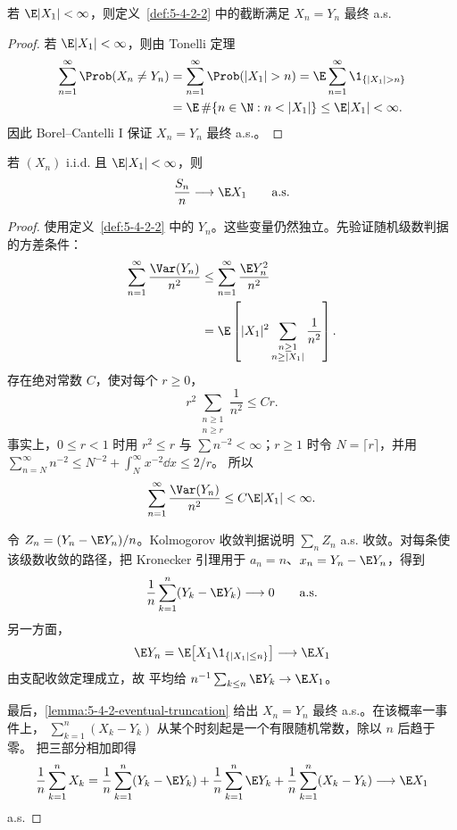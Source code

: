 \begin{lemma}[可积变量的逐项截断最终不变]\label{lemma:5-4-2-eventual-truncation}
若 $\E|X_1|<\infty$，则定义~\ref{def:5-4-2-2} 中的截断满足 $X_n=Y_n$ 最终 a.s.
\end{lemma}

\begin{proof}
若 $\E|X_1|<\infty$，则由 Tonelli 定理
\begin{align*}
 \sum_{n=1}^{\infty}\Prob(X_n\ne Y_n)
 &=\sum_{n=1}^{\infty}\Prob(|X_1|>n)
 =\E\sum_{n=1}^{\infty}\1_{\{|X_1|>n\}}\\
 &=\E\,\#\{n\in\N:n<|X_1|\}
 \leq\E|X_1|<\infty.
\end{align*}
因此 Borel--Cantelli I 保证 $X_n=Y_n$ 最终 a.s.。
\end{proof}

\begin{theorem}\label{theorem:5-4-2-4}
若 $(X_n)$ i.i.d. 且 $\E|X_1|<\infty$，则
\[
 \frac{S_n}{n}\longrightarrow\E X_1\qquad\text{a.s.}
\]
\end{theorem}

\begin{proof}
使用定义~\ref{def:5-4-2-2} 中的 $Y_n$。这些变量仍然独立。先验证随机级数判据的方差条件：
\begin{align*}
 \sum_{n=1}^{\infty}\frac{\Var(Y_n)}{n^2}
 &\leq\sum_{n=1}^{\infty}\frac{\E Y_n^2}{n^2}\\
 &=\E\left[|X_1|^2
       \sum_{\substack{n\geq1\\n\geq|X_1|}}\frac1{n^2}\right].
\end{align*}
存在绝对常数 $C$，使对每个 $r\geq0$，
\[
 r^2\sum_{\substack{n\geq1\\n\geq r}}\frac1{n^2}\leq Cr.
\]
事实上，$0\leq r<1$ 时用 $r^2\leq r$ 与 $\sum n^{-2}<\infty$；$r\geq1$ 时令
$N=\lceil r\rceil$，并用
$\sum_{n=N}^{\infty}n^{-2}\leq N^{-2}+\int_N^\infty x^{-2}\dd x\leq2/r$。
所以
\[
 \sum_{n=1}^{\infty}\frac{\Var(Y_n)}{n^2}
 \leq C\E|X_1|<\infty.
\]

令 $Z_n=(Y_n-\E Y_n)/n$。Kolmogorov 收敛判据说明
$\sum_nZ_n$ a.s. 收敛。对每条使该级数收敛的路径，把 Kronecker 引理用于
$a_n=n$、$x_n=Y_n-\E Y_n$，得到
\[
 \frac1n\sum_{k=1}^n(Y_k-\E Y_k)\longrightarrow0
 \qquad\text{a.s.}
\]
另一方面，
\[
 \E Y_n=\E\bigl[X_1\1_{\{|X_1|\leq n\}}\bigr]\longrightarrow\E X_1
\]
由支配收敛定理成立，故 \Cesaro{} 平均给
$n^{-1}\sum_{k\leq n}\E Y_k\to\E X_1$。

最后，\cref{lemma:5-4-2-eventual-truncation} 给出 $X_n=Y_n$ 最终 a.s.。在该概率一事件上，
$\sum_{k=1}^n(X_k-Y_k)$ 从某个时刻起是一个有限随机常数，除以 $n$ 后趋于零。
把三部分相加即得
\[
 \frac1n\sum_{k=1}^nX_k
 =\frac1n\sum_{k=1}^n(Y_k-\E Y_k)
  +\frac1n\sum_{k=1}^n\E Y_k
  +\frac1n\sum_{k=1}^n(X_k-Y_k)
 \longrightarrow\E X_1
\]
a.s.
\end{proof}

